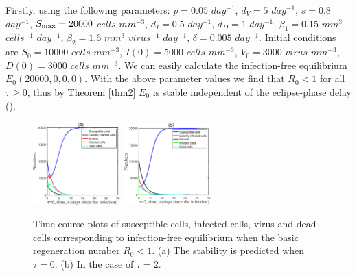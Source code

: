 \documentclass{CMHPhD-SIVD}
\begin{document}
Firstly, using the following parameters: $p=0.05$ $day^{-1}$, $d_V=5$ $day^{-1}$, $s=0.8$ $day^{-1}$, $S_{\text{max}}=20000$ $cells$ $mm^{-3}$, $d_I=0.5$ $day^{-1}$, $d_D=1$ $day^{-1}$, $\beta_1=0.15$ $mm^{3}$ $cells^{-1}$ $day^{-1}$, $\beta_2=1.6$ $mm^{3}$ $virus^{-1}$ $day^{-1}$, $\delta=0.005$ $day^{-1}$.  
Initial conditions are $S_0=10000$ $cells$ $mm^{-3}$, $I(0)=5000$ $cells$ $mm^{-3}$, $V_0=3000$ $virus$ $mm^{-3}$, $D(0)=3000$ $cells$ $mm^{-3}$. 
We can easily calculate the infection-free equilibrium $E_0(20000,0,0,0)$. 
With the above parameter values we find that $R_0 < 1$ for all $\tau\ge0$, thus by Theorem \ref{thm2} $E_0$ is stable independent of the eclipse-phase delay ().
\begin{figure}[h!]
\centering
\includegraphics[height=0.16\textheight,width=0.3\textwidth]{G3.eps}
\includegraphics[height=0.16\textheight,width=0.3\textwidth]{G1.eps}
\vspace{3mm}
\caption{Time course plots of susceptible cells, infected cells, virus and dead cells corresponding to infection-free equilibrium when the basic regeneration number $R_0<1$. (a) The stability is predicted when $\tau=0$. (b) In the case of $\tau=2$.}
\label{Fig.2A}
\end{figure}
\end{document}
